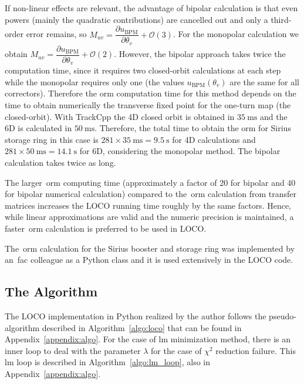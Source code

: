 If non-linear effects are relevant, the advantage of bipolar calculation is that even powers (mainly the quadratic contributions) are cancelled out and only a third-order error remains, so $M_{uv} = \dfrac{\partial u_{\mathrm{BPM}}}{\partial \theta_v} + \mathcal{O}(3)$. For the monopolar calculation we obtain $M_{uv} = \dfrac{\partial u_{\mathrm{BPM}}}{\partial \theta_v} + \mathcal{O}(2)$. However, the bipolar approach takes twice the computation time, since it requires two closed-orbit calculations at each step while the monopolar requires only one (the values $u_{\mathrm{BPM}}\left(\theta_v \right)$ are the same for all correctors). Therefore the \gls{orm} computation time for this method depends on the time to obtain numerically the transverse fixed point for the one-turn map (the closed-orbit). With TrackCpp the 4D closed orbit is obtained in $\SI{35}{\milli\second}$ and the 6D is calculated in $\SI{50}{\milli\second}$. Therefore, the total time to obtain the \gls{orm} for Sirius storage ring in this case is $281 \times \SI{35}{\milli\second} = \SI{9.5}{\second}$ for 4D calculations and $281 \times \SI{50}{\milli\second} = \SI{14.1}{\second}$ for 6D, considering the monopolar method. The bipolar calculation takes twice as long.

The larger~\gls{orm} computing time (approximately a factor of 20 for bipolar and 40 for bipolar numerical calculation) compared to the~\gls{orm} calculation from transfer matrices increases the LOCO running time roughly by the same factors. Hence, while linear approximations are valid and the numeric precision is maintained, a faster~\gls{orm} calculation is preferred to be used in LOCO.

The~\gls{orm} calculation for the Sirius booster and storage ring was implemented by an~\gls{fac} colleague as a Python class and it is used extensively in the LOCO code.
\subsection{The Algorithm}
The LOCO implementation in Python realized by the author follows the pseudo-algorithm described in Algorithm~\ref{algo:loco} that can be found in Appendix~\ref{appendix:algo}. For the case of \gls{lm} minimization method, there is an inner loop to deal with the parameter $\lambda$ for the case of $\chi^2$ reduction failure. This \gls{lm} loop is described in Algorithm~\ref{algo:lm_loop}, also in Appendix~\ref{appendix:algo}.

